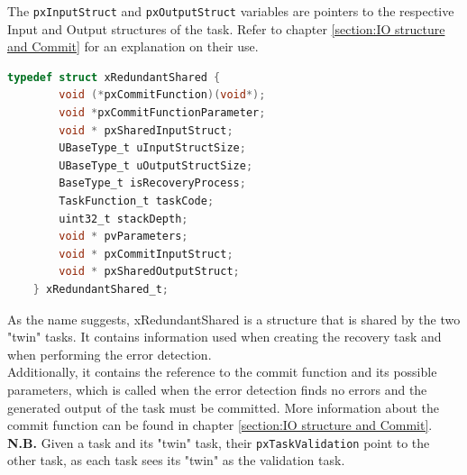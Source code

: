 \documentclass[a4paper, 12pt]{article}
\begin{document}
\begin{onehalfspace}
The \texttt{pxInputStruct} and \texttt{pxOutputStruct} variables are pointers to the respective Input and Output structures of the task. Refer to chapter \ref{section:IO structure and Commit} for an explanation on their use.
 \begin{lstlisting}[language=C]
 typedef struct xRedundantShared {
        void (*pxCommitFunction)(void*);               
        void *pxCommitFunctionParameter;               
        void * pxSharedInputStruct;                  
        UBaseType_t uInputStructSize;                  
        UBaseType_t uOutputStructSize;                 
        BaseType_t isRecoveryProcess;                  
        TaskFunction_t taskCode;                       
        uint32_t stackDepth;                           
        void * pvParameters;                           
        void * pxCommitInputStruct;                    
        void * pxSharedOutputStruct;                  
    } xRedundantShared_t;
\end{lstlisting}
As the name suggests, xRedundantShared is a structure that is shared by the two "twin" tasks. It contains information used when creating the recovery task and when performing the error detection.\\ Additionally, it contains the reference to the commit function and its possible parameters, which is called when the error detection finds no errors and the generated output of the task must be committed. More information about the commit function can be found in chapter \ref{section:IO structure and Commit}. \\
\textbf{N.B.} Given a task and its "twin" task, their \texttt{pxTaskValidation} point to the other task, as each task sees its "twin" as the validation task.\\

\end{onehalfspace}
\end{document}
